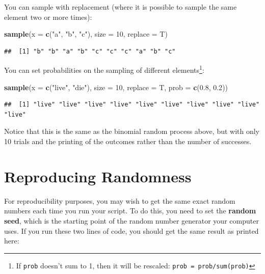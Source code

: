\documentclass[]{book}
\newenvironment{Shaded}{\begin{snugshade}}{\end{snugshade}}
\newcommand{\DataTypeTok}[1]{\textcolor[rgb]{0.13,0.29,0.53}{#1}}
\newcommand{\DecValTok}[1]{\textcolor[rgb]{0.00,0.00,0.81}{#1}}
\newcommand{\FloatTok}[1]{\textcolor[rgb]{0.00,0.00,0.81}{#1}}
\newcommand{\KeywordTok}[1]{\textcolor[rgb]{0.13,0.29,0.53}{\textbf{#1}}}
\newcommand{\NormalTok}[1]{#1}
\newcommand{\StringTok}[1]{\textcolor[rgb]{0.31,0.60,0.02}{#1}}
\let\rmarkdownfootnote\footnote%
\def\footnote{\protect\rmarkdownfootnote}
\begin{document}
You can sample with replacement (where it is possible to sample the same element two or more times):

\begin{Shaded}
\begin{Highlighting}[]
\KeywordTok{sample}\NormalTok{(}\DataTypeTok{x =} \KeywordTok{c}\NormalTok{(}\StringTok{"a"}\NormalTok{, }\StringTok{"b"}\NormalTok{, }\StringTok{"c"}\NormalTok{), }\DataTypeTok{size =} \DecValTok{10}\NormalTok{, }\DataTypeTok{replace =}\NormalTok{ T)}
\end{Highlighting}
\end{Shaded}

\begin{verbatim}
##  [1] "b" "b" "a" "b" "c" "c" "c" "a" "b" "c"
\end{verbatim}

You can set probabilities on the sampling of different elements\footnote{If \texttt{prob} doesn't sum to 1, then it will be rescaled: \texttt{prob\ =\ prob/sum(prob)}}:

\begin{Shaded}
\begin{Highlighting}[]
\KeywordTok{sample}\NormalTok{(}\DataTypeTok{x =} \KeywordTok{c}\NormalTok{(}\StringTok{"live"}\NormalTok{, }\StringTok{"die"}\NormalTok{), }\DataTypeTok{size =} \DecValTok{10}\NormalTok{, }\DataTypeTok{replace =}\NormalTok{ T,}
       \DataTypeTok{prob =} \KeywordTok{c}\NormalTok{(}\FloatTok{0.8}\NormalTok{, }\FloatTok{0.2}\NormalTok{))}
\end{Highlighting}
\end{Shaded}

\begin{verbatim}
##  [1] "live" "live" "live" "live" "live" "live" "live" "live" "live" "live"
\end{verbatim}

Notice that this is the same as the binomial random process above, but with only 10 trials and the printing of the outcomes rather than the number of successes.

\hypertarget{reproducing-randomness}{%
\section{Reproducing Randomness}\label{reproducing-randomness}}

For reproducibility purposes, you may wish to get the same exact random numbers each time you run your script. To do this, you need to set the \textbf{random seed}, which is the starting point of the random number generator your computer uses. If you run these two lines of code, you should get the same result as printed here:
\end{document}

